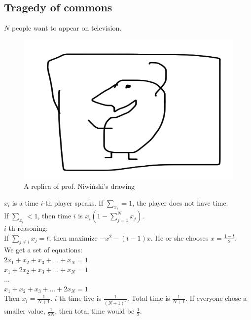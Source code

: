 \subsection*{Tragedy of commons}
$N$ people want to appear on television.
\begin{figure}[H]
    \centering
    \caption{A replica of prof. Niwiński's drawing}
    \includegraphics[scale=0.1]{content/graphics/game24.png}
\end{figure}
\noindent
$x_i$ is a time $i$-th player speaks. If $\sum_{x_i} = 1$, the player does not have time.\\
If $\sum_{x_i} < 1$, then time $i$ is $x_i (1 - \sum_{j=1}^{N} x_j)$.\\
$i$-th reasoning:\\
If $\sum_{j \neq i} x_j = t$, then maximize $-x^2 - (t-1)x$. He or she chooses $x = \frac{1-t}{2}$.\\
We get a set of equations:\\
$2x_1 + x_2 + x_3 + ... + x_N = 1$\\
$x_1 + 2x_2 + x_3 + ... + x_N = 1$\\
...\\
$x_1 + x_2 + x_3 + ... + 2x_N = 1$\\
Then $x_i = \frac{1}{N+1}$. $i$-th time live is $\frac{1}{(N+1)^2}$. Total time is $\frac{1}{N+1}$.
If everyone chose a smaller value, $\frac{1}{2N}$, then total time would be $\frac{1}{2}$.
